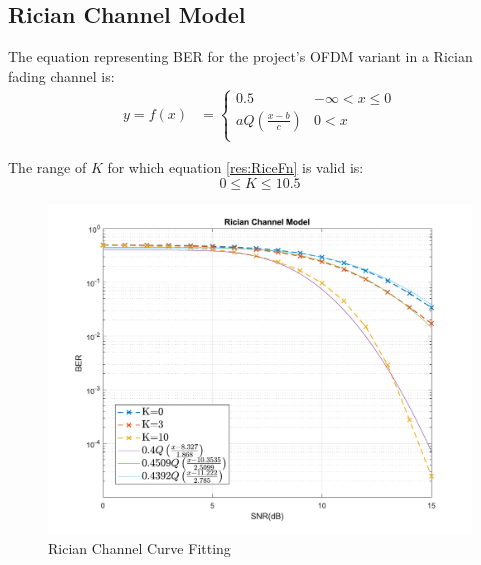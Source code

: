 \subsection{Rician Channel Model}
The equation representing BER for the project's OFDM variant in a Rician fading channel is:
\begin{align}
	\label{res:RiceFn}
	y = f(x) &=
	\begin{cases}
		0.5 & -\infty < x \leq 0 \\
		aQ \left(\frac{x - b}{c}\right) & 0 < x \\
	\end{cases}
\end{align}
\begin{mathDef}
\end{mathDef}
The range of \(K\) for which equation \eqref{res:RiceFn} is valid is:
\[
	0 \leq K \leq 10.5
\]
\begin{figure}[htpb!]
    \centering
    \includegraphics[scale=0.56]{Graphics/Methodology/RiceCurveFit.pdf}
    \caption{Rician Channel Curve Fitting}
	\label{fig:riceCurveFit}
\end{figure}


\pagebreak


